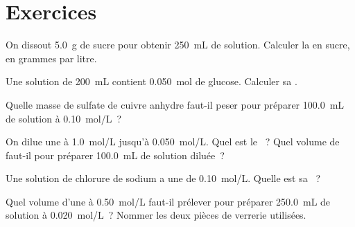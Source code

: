 \section{Exercices}

\begin{exercise}[$\star$]\label{exo:g10:concentration-and-dilution:1}
On dissout \qty{5.0}{g} de sucre pour obtenir \qty{250}{mL} de
solution. Calculer la  en sucre, en grammes par
litre.
\end{exercise}

\begin{exercise}[$\star$]\label{exo:g10:concentration-and-dilution:2}
Une solution de \qty{200}{mL} contient \qty{0.050}{mol} de glucose.
Calculer sa .
\end{exercise}

\begin{exercise}[$\star$]\label{exo:g10:concentration-and-dilution:3}
Quelle masse de sulfate de cuivre anhydre  faut-il peser pour
préparer \qty{100.0}{mL} de solution à \qty{0.10}{mol/L}~?
\end{exercise}

\begin{exercise}[$\star$]\label{exo:g10:concentration-and-dilution:4}
On dilue une  à \qty{1.0}{mol/L} jusqu'à \qty{0.050}{mol/L}.
Quel est le ~? Quel volume de  faut-il
pour préparer \qty{100.0}{mL} de solution diluée~?
\end{exercise}

\begin{exercise}[$\star$]\label{exo:g10:concentration-and-dilution:5}
Une solution de chlorure de sodium a une  de
\qty{0.10}{mol/L}. Quelle est sa ~?
\end{exercise}

\begin{exercise}[$\star\star$]\label{exo:g10:concentration-and-dilution:6}
Quel volume d'une  à \qty{0.50}{mol/L} faut-il prélever
pour préparer \qty{250.0}{mL} de solution à \qty{0.020}{mol/L}~?
Nommer les deux pièces de verrerie utilisées.
\end{exercise}

